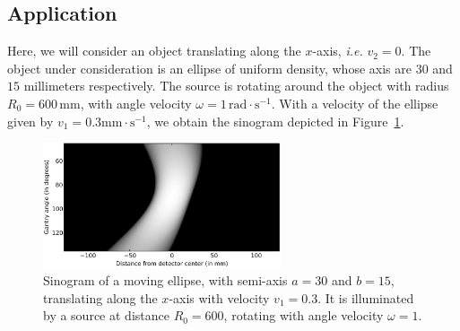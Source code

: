 \documentclass[9pt,technote]{IEEEtran}
\numberwithin{equation}{section}
\newcommand{\ie}{\emph{i.e.} }
\begin{document}
\subsection{Application}
\label{sub:application}
Here, we will consider an object translating along the $x$-axis, \ie $v_2=0$. The object under consideration is an ellipse of uniform density, whose axis are $30$ and $15$ millimeters respectively. The source is rotating around the object with radius $R_0 = 600 \, \textrm{mm}$, with angle velocity $\omega = 1 \, \textrm{rad} \cdot \textrm{s}^{-1}$. With a velocity of the ellipse given by $v_1 = 0.3 \textrm{mm} \cdot \textrm{s}^{-1}$, we obtain the sinogram depicted in Figure~\ref{fig:sinogram}.
\begin{figure}[!ht]
	\centering
	\includegraphics[width=7cm]{figs/sinogram.png}
	\caption{Sinogram of a moving ellipse, with semi-axis $a = 30$ and $b = 15$, translating along the $x$-axis with velocity $v_1 = 0.3$. It is illuminated by a source at distance $R_0 = 600$, rotating with angle velocity $\omega = 1$.\label{fig:sinogram}}
\end{figure}
\end{document}
